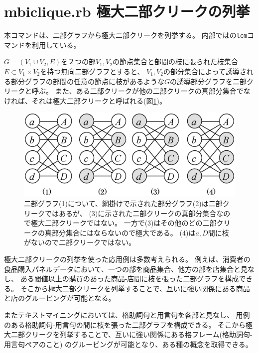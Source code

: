 
\section{mbiclique.rb 極大二部クリークの列挙\label{sect:mbiclique}}

本コマンドは、二部グラフから極大二部クリークを列挙する。
内部では\cite{UnoWeb}の\verb|lcm|コマンドを利用している。

$G=(V_1 \cup V_2,E)$を２つの部$V_1,V_2$の節点集合と部間の枝に張られた枝集合$E\subset V_1\times V_2$を持つ無向二部グラフとすると、
$V_1,V_2$の部分集合によって誘導される部分グラフの部間の任意の節点に枝があるような$G$の誘導部分グラフを二部クリークと呼ぶ。
また、ある二部クリークが他の二部クリークの真部分集合でなければ、それは極大二部クリークと呼ばれる(図\ref{fig:biclique})。

\begin{figure}[htbp]
\begin{center}
\includegraphics[scale=0.5]{./biclique.eps}
\caption{二部グラフ(1)について、網掛けで示された部分グラフ(2)は二部クリークではあるが、
(3)に示された二部クリークの真部分集合なので極大二部クリークではない。
一方で(3)はその他のどの二部クリークの真部分集合にはならないので極大である。
(4)は$a,D$間に枝がないので二部クリークではない。
\label{fig:biclique}}
\end{center}
\end{figure} 

極大二部クリークの列挙を使った応用例は多数考えられる。
例えば、消費者の食品購入パネルデータにおいて、一つの部を商品集合、他方の部を店集合と見なし、
ある閾値以上の購買のあった商品-店間に枝を張った二部グラフを構成できる。
そこから極大二部クリークを列挙することで、互いに強い関係にある商品と店のグルーピングが可能となる。

またテキストマイニングにおいては、格助詞句と用言句を各部と見なし、
用例のある格助詞句-用言句の間に枝を張った二部グラフを構成できる。
そこから極大二部クリークを列挙することで、互いに強い関係にある格フレーム(格助詞句-用言句ペアのこと)
のグルーピングが可能となり、ある種の概念を取得できる。


